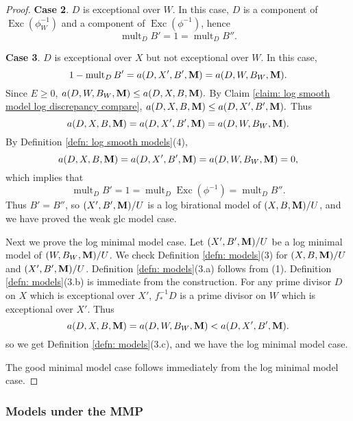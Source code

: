 \documentclass[11pt]{amsart}
\numberwithin{equation}{section}
\newcommand{\Mm}{{\bf{M}}}
\newcommand{\Exc}{\operatorname{Exc}}
\newcommand{\mult}{\operatorname{mult}}
\theoremstyle{definition}
\theoremstyle{definition}
\theoremstyle{definition}
\begin{document}
\begin{proof}
\medskip

\noindent\textbf{Case 2}. $D$ is exceptional over $W$. In this case, $D$ is a component of $\Exc(\phi_W^{-1})$ and a component of $\Exc(\phi^{-1})$, hence
$$\mult_DB'=1=\mult_DB''.$$

\medskip

\noindent\textbf{Case 3}. $D$ is exceptional over $X$ but not exceptional over $W$. In this case,
$$1-\mult_DB'=a(D,X',B',\Mm)=a(D,W,B_W,\Mm).$$
Since $E\geq 0$,
$a(D,W,B_W,\Mm)\leq a(D,X,B,\Mm).$
By Claim \ref{claim: log smooth model log discrepancy compare}, 
$a(D,X,B,\Mm)\leq a(D,X',B',\Mm).$
Thus
$$a(D,X,B,\Mm)=a(D,X',B',\Mm)=a(D,W,B_W,\Mm).$$
By Definition \ref{defn: log smooth models}(4), $$a(D,X,B,\Mm)=a(D,X',B',\Mm)=a(D,W,B_W,\Mm)=0,$$
which implies that
$$\mult_DB'=1=\mult_D\Exc(\phi^{-1})=\mult_DB''.$$
Thus $B'=B''$, so $(X',B',\Mm)/U$ is a log birational model of $(X,B,\Mm)/U$, and we have proved the weak glc model case.

Next we prove the log minimal model case. Let $(X',B',\Mm)/U$ be a log minimal model of $(W,B_W,\Mm)/U$. We check Definition \ref{defn: models}(3) for $(X,B,\Mm)/U$ and $(X',B',\Mm)/U$. Definition \ref{defn: models}(3.a) follows from (1). Definition \ref{defn: models}(3.b) is immediate from the construction. For any prime divisor $D$ on $X$ which is exceptional over $X'$, $f^{-1}_*D$ is a prime divisor on $W$ which is exceptional over $X'$. Thus
$$a(D,X,B,\Mm)=a(D,W,B_W,\Mm)<a(D,X',B',\Mm).$$
so we get Definition \ref{defn: models}(3.c), and we have the log minimal model case.

The good minimal model case follows immediately from the log minimal model case.
\end{proof}

\subsubsection{Models under the MMP}
\end{document}
